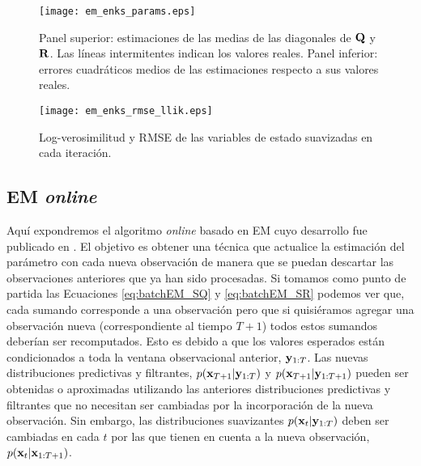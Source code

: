 \begin{figure}[h]
    \centering
    \texttt{[image: em\_enks\_params.eps]}
    \caption{Panel superior: estimaciones de las medias de las diagonales de $\mathbf{Q}$ y $\mathbf{R}$. Las líneas intermitentes indican los valores reales. Panel inferior: errores cuadráticos medios de las estimaciones respecto a sus valores reales.}
    \label{fig:em_enks_params}
\end{figure}

\begin{figure}[h]
    \centering
    \texttt{[image: em\_enks\_rmse\_llik.eps]}
    \caption{Log-verosimilitud y RMSE de las variables de estado suavizadas en cada iteración.}
    \label{fig:em_enks_rmse_llik}
\end{figure}

\subsection{EM \textit{online}} \label{sec:onlineEM}

Aquí expondremos el algoritmo \textit{online} basado en EM cuyo desarrollo fue publicado en \cite{Cocucci2021}. El objetivo es obtener una técnica que actualice la estimación del parámetro con cada nueva observación de manera que se puedan descartar las observaciones anteriores que ya han sido procesadas. Si tomamos como punto de partida las Ecuaciones \ref{eq:batchEM_SQ} y \ref{eq:batchEM_SR} podemos ver que, cada sumando corresponde a una observación pero que si quisiéramos agregar una observación nueva (correspondiente al tiempo $T+1$) todos estos sumandos deberían ser recomputados. Esto es debido a que los valores esperados están condicionados a toda la ventana observacional anterior, $\mathbf{y}_{1:T}$. Las nuevas distribuciones predictivas y filtrantes, $p(\mathbf{x}_{T+1} | \mathbf{y}_{1:T})$ y $p(\mathbf{x}_{T+1} | \mathbf{y}_{1:T+1})$ pueden ser obtenidas o aproximadas utilizando las anteriores distribuciones predictivas y filtrantes que no necesitan ser cambiadas por la incorporación de la nueva observación. Sin embargo, las distribuciones suavizantes $p(\mathbf{x}_t | \mathbf{y}_{1:T})$ deben ser cambiadas en cada $t$ por las que tienen en cuenta a la nueva observación, $p(\mathbf{x}_t | \mathbf{x}_{1:T+1})$.


